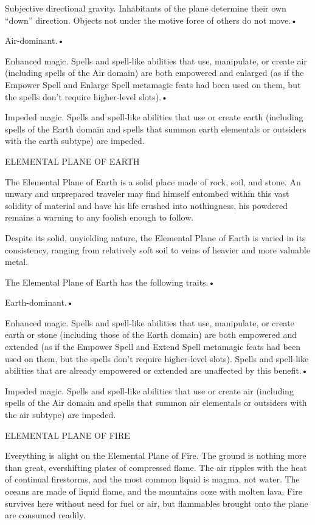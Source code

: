 \documentclass{article}
\begin{document}
\parindent=3pt
Subjective directional gravity. Inhabitants of the plane determine their own ``down'' 
direction. Objects not under the motive force of others do not move.• 

Air-dominant.• 

\parindent=7pt
Enhanced magic. Spells and spell-like abilities that use, manipulate, or create 
air (including spells of the Air domain) are both empowered and enlarged (as if 
the Empower Spell and Enlarge Spell metamagic feats had been used on them, but 
the spells don't require higher-level slots).• 

\parindent=3pt
Impeded magic. Spells and spell-like abilities that use or create earth (including 
spells of the Earth domain and spells that summon earth elementals or outsiders 
with the earth subtype) are impeded.

\vspace{12pt}
\parindent=0pt
ELEMENTAL PLANE OF EARTH

The Elemental Plane of Earth is a solid place made of rock, soil, and stone. An 
unwary and unprepared traveler may find himself entombed within this vast solidity 
of material and have his life crushed into nothingness, his powdered remains a 
warning to any foolish enough to follow.

Despite its solid, unyielding nature, the Elemental Plane of Earth is varied in 
its consistency, ranging from relatively soft soil to veins of heavier and more 
valuable metal. 

The Elemental Plane of Earth has the following traits.• 

\parindent=3pt
Earth-dominant.• 

Enhanced magic. Spells and spell-like abilities that use, manipulate, or create 
earth or stone (including those of the Earth domain) are both empowered and extended 
(as if the Empower Spell and Extend Spell metamagic feats had been used on them, 
but the spells don't require higher-level slots). Spells and spell-like abilities 
that are already empowered or extended are unaffected by this benefit.• 

\parindent=7pt
Impeded magic. Spells and spell-like abilities that use or create air (including 
spells of the Air domain and spells that summon air elementals or outsiders with 
the air subtype) are impeded.

\vspace{12pt}
\parindent=0pt
ELEMENTAL PLANE OF FIRE

Everything is alight on the Elemental Plane of Fire. The ground is nothing more 
than great, evershifting plates of compressed flame. The air ripples with the heat 
of continual firestorms, and the most common liquid is magma, not water. The oceans 
are made of liquid flame, and the mountains ooze with molten lava. Fire survives 
here without need for fuel or air, but flammables brought onto the plane are consumed 
readily. 
\end{document}

